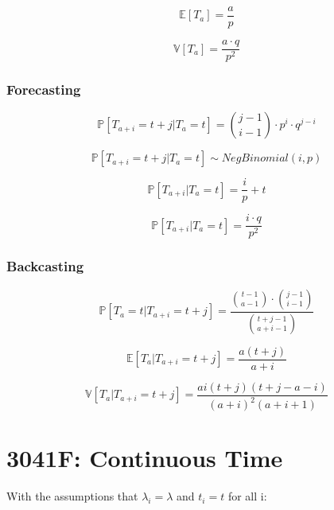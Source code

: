 \begin{equation}
    \mathbb{E}[T_a] = \frac{a}{p}
\end{equation}

\begin{equation}
    \mathbb{V}[T_a] = \frac{a \cdot q}{p^2}
\end{equation}


\subsubsection{Forecasting}
\begin{equation}
    \mathbb{P}[T_{a + i} = t + j | T_a = t] =
    \binom{j-1}{i-1} \cdot p^i \cdot q^{j-i}
\end{equation}

\begin{equation}
    \mathbb{P}[T_{a + i} = t + j | T_a = t] \sim NegBinomial(i, p)
\end{equation}


\begin{equation}
    \mathbb{P}[T_{a + i} | T_a = t] = 
    \frac{i}{p} + t
\end{equation}

\begin{equation}
    \mathbb{P}[T_{a + i} | T_a = t] = 
    \frac{i \cdot q}{p^2}
\end{equation}

\subsubsection{Backcasting}
\begin{equation}
    \mathbb{P}[T_a = t | T_{a + i} = t + j] =
    \frac{
        \binom{t - 1}{a - 1} \cdot \binom{j - 1}{i - 1}
        }{
        \binom{t + j - 1}{a + i - 1}
    }
\end{equation}

\begin{equation}
    \mathbb{E}[T_a | T_{a + i} = t + j] = \frac{a (t + j)}{ a + i }
\end{equation}


\begin{equation}
    \mathbb{V}[T_a | T_{a + i} = t + j] = 
    \frac{
        a i (t + j) (t + j - a - i)
        }{
        (a + i)^2 (a + i + 1)
    }
\end{equation}
\section{3041F: Continuous Time}
With the assumptions that \(\lambda_i = \lambda\) and \(t_i = t\) for all i:

